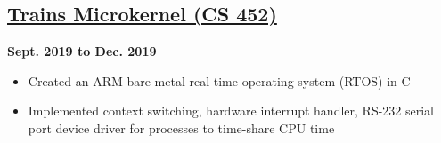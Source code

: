 \documentclass[12pt]{extarticle}
\begin{document}
\subsection*{\href{https://github.com/cgwelcome/train-microkernel}{Trains Microkernel (CS 452)}} \hfill \textbf{Sept. 2019 to Dec. 2019}
\begin{itemize}
  \item Created an ARM bare-metal real-time operating system (RTOS) in C
  \item Implemented context switching, hardware interrupt handler, RS-232 serial port device driver for processes to time-share CPU time
\end{itemize}
\end{document}
